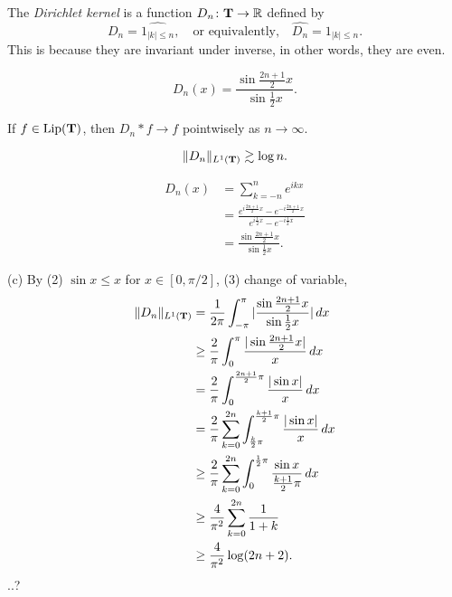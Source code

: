 \documentclass{../../large}
\begin{document}
\begin{prb}
The \emph{Dirichlet kernel} is a function $D_n\colon \mathbf{T}\to\mathbb{R}$ defined by
\[D_n=\hat{1_{|k|\le n}},\quad\text{or equivalently,}\quad\hat{D_n}=1_{|k|\le n}.\]
This is because they are invariant under inverse, in other words, they are even.
\begin{parts}
\item
\[D_n(x)=\frac{\sin\frac{2n+1}2x}{\sin\frac12x}.\]
\item If $f\in\operatorname{Lip}(\mathbf{T})$, then $D_n*f\to f$ pointwisely as $n\to\infty$.
\item
\[\|D_n\|_{L^1(\mathbf{T})}\gtrsim\log n.\]
\end{parts}
\end{prb}

\begin{pf}
\begin{align*}
D_n(x)&=\sum_{k=-n}^ne^{ikx}\\
&=\frac{e^{i\frac{2n+1}2x}-e^{-i\frac{2n+1}2x}}{e^{i\frac12x}-e^{-i\frac12x}}\\
&=\frac{\sin\frac{2n+1}2x}{\sin\frac12x}.
\end{align*}

(c)
By (2) $\sin x\le x$ for $x\in[0,\pi/2]$, (3) change of variable,
\begin{align*}
\|D_n\|_{L^1(\mathbf{T})}
&=\frac1{2\pi}\int_{-\pi}^\pi|\frac{\sin\frac{2n+1}2x}{\sin\frac12x}|\,dx\\
&\ge\frac2\pi\int_0^\pi\frac{|\sin\frac{2n+1}2x|}x\,dx\\
&=\frac2\pi\int_0^{\frac{2n+1}2\pi}\frac{|\sin x|}x\,dx\\
&=\frac2\pi\sum_{k=0}^{2n}\int_{\frac k2\pi}^{\frac{k+1}2\pi}\frac{|\sin x|}x\,dx\\
&\ge\frac2\pi\sum_{k=0}^{2n}\int_0^{\frac12\pi}\frac{\sin x}{\frac{k+1}2\pi}\,dx\\
&\ge\frac4{\pi^2}\sum_{k=0}^{2n}\frac1{1+k}\\
&\ge\frac4{\pi^2}\log(2n+2).
\end{align*}
..?
\end{pf}
\end{document}
